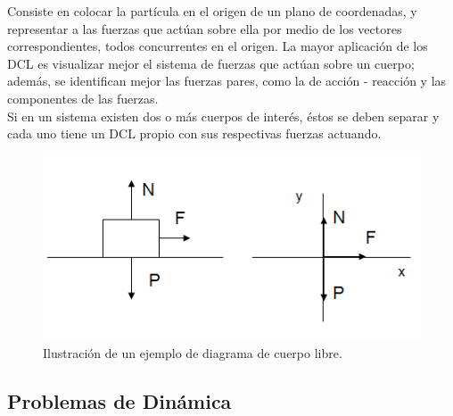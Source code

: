 \documentclass[a5paper,pagesize,10pt,bibtotoc,pointlessnumbers,
normalheadings,DIV=9,fleqn,x11names,table,twoside=false]{scrbook}
\begin{document}
Consiste en colocar la partícula en el origen de un plano de coordenadas, y representar a las fuerzas que actúan sobre ella por 
medio de los vectores correspondientes, todos concurrentes en el origen. La mayor aplicación de los DCL es visualizar mejor el 
sistema de fuerzas que actúan sobre un cuerpo; además, se identifican mejor las fuerzas pares, como la de acción - reacción y las 
componentes de las fuerzas.\\

Si en un sistema existen dos o más cuerpos de interés, éstos se deben separar y cada uno tiene un DCL propio con sus respectivas 
fuerzas actuando.

\begin{figure}[H]
 \centering
 \includegraphics[scale=0.6]{images/cuerpo-libre.png}
 \caption{Ilustración de un ejemplo de diagrama de cuerpo libre.}\label{frb}
\end{figure}

\subsection{Problemas de Dinámica}
\end{document}
